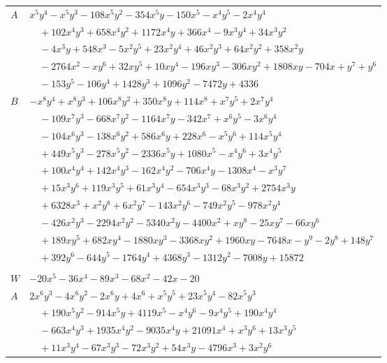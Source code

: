 \documentclass[11pt]{article}
\begin{document}
\begin{longtable}{@{}ll@{}}
$A$ & $x^{5}y^{4}-x^{5}y^{3}-108x^{5}y^{2}-354x^{5}y-150x^{5}-x^{4}y^{5}-2x^{4}y^{4}$\\
 & $\quad +102x^{4}y^{3}+658x^{4}y^{2}+1172x^{4}y+366x^{4}-9x^{3}y^{4}+34x^{3}y^{2}$\\
 & $\quad -4x^{3}y+548x^{3}-5x^{2}y^{5}+23x^{2}y^{4}+46x^{2}y^{3}+64x^{2}y^{2}+358x^{2}y$\\
 & $\quad -2764x^{2}-xy^{6}+32xy^{5}+10xy^{4}-196xy^{3}-306xy^{2}+1808xy-704x+y^{7}+y^{6}$\\
 & $\quad -153y^{5}-106y^{4}+1428y^{3}+1096y^{2}-7472y+4336$\\
$B$ & $-x^{8}y^{4}+x^{8}y^{3}+106x^{8}y^{2}+350x^{8}y+114x^{8}+x^{7}y^{5}+2x^{7}y^{4}$\\
 & $\quad -109x^{7}y^{3}-668x^{7}y^{2}-1164x^{7}y-342x^{7}+x^{6}y^{5}-3x^{6}y^{4}$\\
 & $\quad -104x^{6}y^{3}-138x^{6}y^{2}+586x^{6}y+228x^{6}-x^{5}y^{6}+114x^{5}y^{4}$\\
 & $\quad +449x^{5}y^{3}-278x^{5}y^{2}-2336x^{5}y+1080x^{5}-x^{4}y^{6}+3x^{4}y^{5}$\\
 & $\quad +100x^{4}y^{4}+142x^{4}y^{3}-162x^{4}y^{2}-706x^{4}y-1308x^{4}-x^{3}y^{7}$\\
 & $\quad +15x^{3}y^{6}+119x^{3}y^{5}+61x^{3}y^{4}-654x^{3}y^{3}-68x^{3}y^{2}+2754x^{3}y$\\
 & $\quad +6328x^{3}+x^{2}y^{8}+6x^{2}y^{7}-143x^{2}y^{6}-749x^{2}y^{5}-978x^{2}y^{4}$\\
 & $\quad -426x^{2}y^{3}-2294x^{2}y^{2}-5340x^{2}y-4400x^{2}+xy^{8}-25xy^{7}-66xy^{6}$\\
 & $\quad +189xy^{5}+682xy^{4}-1880xy^{3}-3368xy^{2}+1960xy-7648x-y^{9}-2y^{8}+148y^{7}$\\
 & $\quad +392y^{6}-644y^{5}-1764y^{4}+4368y^{3}-1312y^{2}-7008y+15872$\\
\addlinespace[3pt]
\multicolumn{2}{@{}l}{$i=28$, $m=1$, neighbours $2,3,5,6,9,14,21,23,25,30$}\\
$W$ & $-20x^{5}-36x^{4}-89x^{3}-68x^{2}-42x-20$\\
$A$ & $2x^{6}y^{3}-4x^{6}y^{2}-2x^{6}y+4x^{6}+x^{5}y^{5}+23x^{5}y^{4}-82x^{5}y^{3}$\\
 & $\quad +190x^{5}y^{2}-914x^{5}y+4119x^{5}-x^{4}y^{6}-9x^{4}y^{5}+190x^{4}y^{4}$\\
 & $\quad -663x^{4}y^{3}+1935x^{4}y^{2}-9035x^{4}y+21091x^{4}+x^{3}y^{6}+13x^{3}y^{5}$\\
 & $\quad +11x^{3}y^{4}-67x^{3}y^{3}-72x^{3}y^{2}+54x^{3}y-4796x^{3}+3x^{2}y^{6}$\\

\end{longtable}
\end{document}
